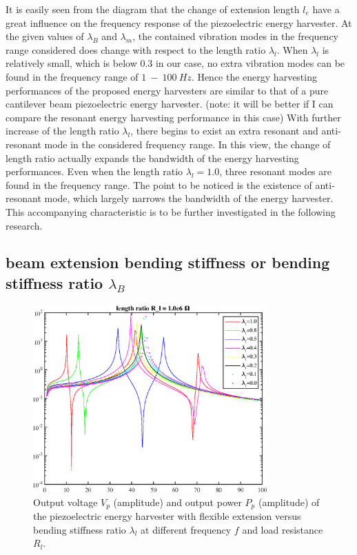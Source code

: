\documentclass{elsarticle}
\begin{document}
It is easily seen from the diagram that the change of extension length $l_e$ have a great influence on the frequency response of the piezoelectric energy harvester. At the given values of $\lambda_B$ and $\lambda_m$, the contained vibration modes in the frequency range considered does change with respect to
the length ratio $\lambda_l$. When $\lambda_l$ is relatively small, which is below $0.3$ in our case, no extra vibration modes can be found in the frequency range of $1\ - \ 100\ Hz$. Hence the energy harvesting performances of the proposed energy harvesters are similar to that of a pure cantilever beam piezoelectric energy harvester. (note: it will be better if I can compare the resonant energy harvesting performance in this case) With further increase of the length ratio $\lambda_l$, there begins to exist an extra resonant and anti-resonant mode in the considered frequency range. In this view, the change of length ratio actually expands the bandwidth of the energy harvesting performances. Even when the length ratio $\lambda_l = 1.0$, three resonant modes are found in the frequency range. The point to be noticed is the existence of anti-resonant mode, which largely narrows the bandwidth of the energy harvester. This accompanying characteristic is to be further investigated in the following research. 


\subsection{beam extension bending stiffness or bending stiffness ratio $\lambda_B$}


\begin{figure}[!htbp]
    \centering
    \includegraphics[width=0.8\textwidth]{./fig_laml_vol_versus_fr_Rl.eps}
    \caption{Output voltage $V_p$ (amplitude) and output power $P_p$ (amplitude) of the piezoelectric energy harvester with flexible extension versus bending stiffness ratio $\lambda_l$ at different frequency $f$ and load resistance $R_l$. }
    \label{fig:fig_lamB_vol_versus_fr_Rl}
\end{figure}
\end{document}
